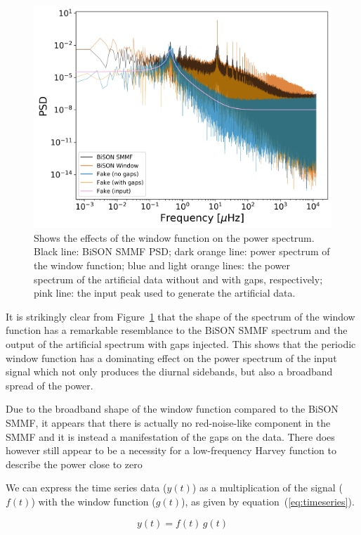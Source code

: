\begin{figure}[ht!]
	\centering
	\includegraphics[width=\columnwidth]{gap_test_rescaled.pdf}
	\caption{Shows the effects of the window function on the power spectrum. Black line: BiSON SMMF PSD; dark orange line: power spectrum of the window function; blue and light orange lines: the power spectrum of the artificial data without and with gaps, respectively; pink line: the input peak used to generate the artificial data.}
	\label{fig:window_function_PSDs}
\end{figure}

It is strikingly clear from Figure~\ref{fig:window_function_PSDs} that the shape of the spectrum of the window function has a remarkable resemblance to the BiSON SMMF spectrum and the output of the artificial spectrum with gaps injected. This shows that the periodic window function has a dominating effect on the power spectrum of the input signal which not only produces the diurnal sidebands, but also a broadband spread of the power.

Due to the broadband shape of the window function compared to the BiSON SMMF, it appears that there is actually no red-noise-like component in the SMMF and it is instead a manifestation of the gaps on the data. There does however still appear to be a necessity for a low-frequency Harvey function to describe the power close to zero

We can express the  time series data ($y(t)$) as a multiplication of the signal ($f(t)$) with the window function ($g(t)$), as given by equation~(\ref{eq:timeseries}).

\begin{equation}
y(t)  = f(t) \, g(t)
\label{eq:timeseries}
\end{equation}

